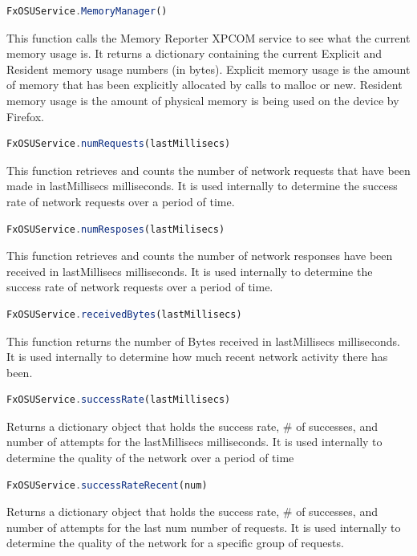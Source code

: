 \documentclass[12pt]{article}
\begin{document}
\begin{itemize}
\begin{lstlisting}[language=JavaScript]
FxOSUService.MemoryManager()
\end{lstlisting} 
This function calls the Memory Reporter XPCOM service to see what the current memory usage is.  It returns a dictionary containing the current Explicit and Resident memory usage numbers (in bytes).  Explicit memory usage is the amount of memory that has been explicitly allocated by calls to malloc or new.  Resident memory usage is the amount of physical memory is being used on the device by Firefox.  \\
\begin{lstlisting}[language=JavaScript]
FxOSUService.numRequests(lastMillisecs)
\end{lstlisting}  
This function retrieves and counts the number of network requests that have been made in lastMillisecs milliseconds.  It is used internally to determine the success rate of network requests over a period of time.  
\begin{lstlisting}[language=JavaScript]
FxOSUService.numResposes(lastMilisecs)
\end{lstlisting} 
This function retrieves and counts the number of network responses have been received in lastMillisecs
milliseconds.  It is used internally to determine the success rate of network requests over a period of time.
\begin{lstlisting}[language=JavaScript]
FxOSUService.receivedBytes(lastMillisecs)
\end{lstlisting}
This function returns the number of Bytes received in lastMillisecs milliseconds.  It is used internally to determine how much recent network activity there has been.  
\begin{lstlisting}[language=JavaScript]
FxOSUService.successRate(lastMillisecs)
\end{lstlisting}
Returns a dictionary object that holds the success rate, \# of successes, and number of attempts for the lastMillisecs milliseconds.  It is used internally to determine the quality of the network over a period of time
\begin{lstlisting}[language=JavaScript]
FxOSUService.successRateRecent(num)
\end{lstlisting}
Returns a dictionary object that holds the success rate, \# of successes, and number of attempts for the last num number of requests. It is used internally to determine the quality of the network for a specific group of requests.
\begin{lstlisting}[language=JavaScript]

\end{lstlisting}
\end{itemize}
\end{document}
